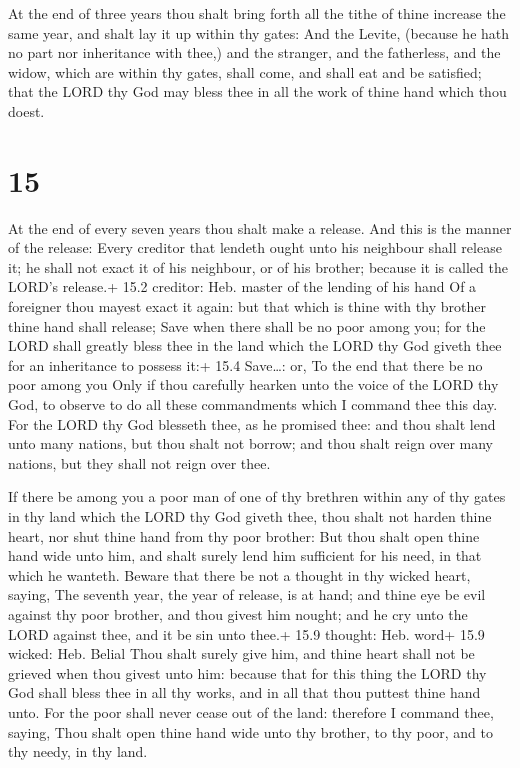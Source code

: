  At the end of three years thou shalt bring forth all the
tithe of thine increase the same year, and shalt lay it up within thy
gates:  And the Levite, (because he hath no part nor
inheritance with thee,) and the stranger, and the fatherless, and the
widow, which are within thy gates, shall come, and shall eat and be
satisfied; that the LORD thy God may bless thee in all the work of thine
hand which thou doest.

\hypertarget{section-14}{%
\section{15}\label{section-14}}

 At the end of every seven years thou shalt make a release.
 And this is the manner of the release: Every creditor that
lendeth ought unto his neighbour shall release it; he shall not exact it
of his neighbour, or of his brother; because it is called the LORD's
release.+ 15.2 creditor: Heb. master of the lending of his hand
 Of a foreigner thou mayest exact it again: but that which
is thine with thy brother thine hand shall release;  Save
when there shall be no poor among you; for the LORD shall greatly bless
thee in the land which the LORD thy God giveth thee for an inheritance
to possess it:+ 15.4 Save\ldots: or, To the end that there be no poor
among you  Only if thou carefully hearken unto the voice of
the LORD thy God, to observe to do all these commandments which I
command thee this day.  For the LORD thy God blesseth thee,
as he promised thee: and thou shalt lend unto many nations, but thou
shalt not borrow; and thou shalt reign over many nations, but they shall
not reign over thee.

 If there be among you a poor man of one of thy brethren
within any of thy gates in thy land which the LORD thy God giveth thee,
thou shalt not harden thine heart, nor shut thine hand from thy poor
brother:  But thou shalt open thine hand wide unto him, and
shalt surely lend him sufficient for his need, in that which he wanteth.
 Beware that there be not a thought in thy wicked heart,
saying, The seventh year, the year of release, is at hand; and thine eye
be evil against thy poor brother, and thou givest him nought; and he cry
unto the LORD against thee, and it be sin unto thee.+ 15.9 thought: Heb.
word+ 15.9 wicked: Heb. Belial  Thou shalt surely give him,
and thine heart shall not be grieved when thou givest unto him: because
that for this thing the LORD thy God shall bless thee in all thy works,
and in all that thou puttest thine hand unto.  For the poor
shall never cease out of the land: therefore I command thee, saying,
Thou shalt open thine hand wide unto thy brother, to thy poor, and to
thy needy, in thy land.

